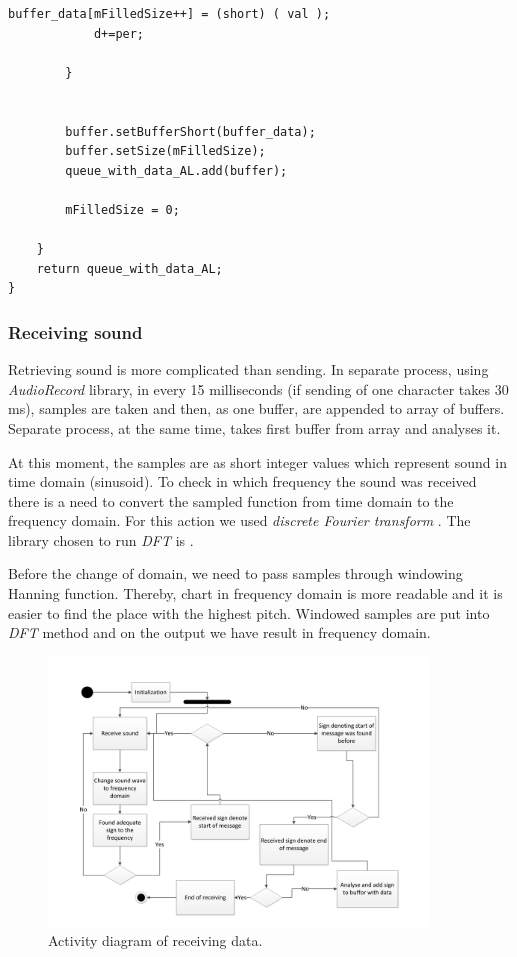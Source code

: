 \documentclass[11pt,titlepage]{article}
\theoremstyle{plain}
\begin{document}
\begin{minipage}{\linewidth}
\begin{lstlisting}[label={lst:sinus}]
			buffer_data[mFilledSize++] = (short) ( val );
			d+=per;
			
		}
		
		
		buffer.setBufferShort(buffer_data);
		buffer.setSize(mFilledSize);
		queue_with_data_AL.add(buffer);
		
		mFilledSize = 0;

	}
	return queue_with_data_AL;
}
\end{lstlisting} 
\end{minipage}

\subsubsection{Receiving sound}

Retrieving sound is more complicated than sending. In separate process, using \textit{AudioRecord} library, in every 15 milliseconds (if sending of one character takes 30 ms), samples are taken and then, as one buffer, are appended to array of buffers. Separate process, at the same time, takes first buffer from array and analyses it. 

\vspace{5mm}

At this moment, the samples are as short integer values which represent sound in time domain (sinusoid). To check in which frequency the sound was received there is a need to convert the sampled function from time domain to the frequency domain. For this action we used \textit{discrete Fourier transform }. The library chosen to run \textit{DFT} is \cite{minim_dft}. 

\vspace{5mm}

Before the change of domain, we need to pass samples through windowing Hanning function. Thereby, chart in frequency domain is more readable and it is easier to find the place with the highest pitch. Windowed samples are put into \textit{DFT} method and on the output we have result in frequency domain.

\begin{figure}[H]
	\centering
	\includegraphics[width=0.9\textwidth]{img/Activity_diag_receiving.pdf}
	\caption{Activity diagram of receiving data.}
	\label{fig:F20}
\end{figure}
\end{document}
